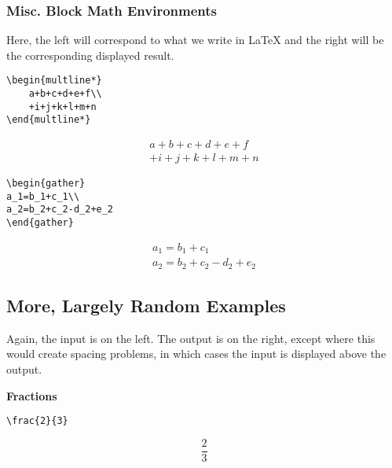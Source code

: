 \documentclass[letterpaper,twoside,10pt]{article}
\begin{document}
\newpage
\subsubsection{Misc. Block Math Environments}

Here, the left will correspond to what we write in {\LaTeX} and the right will be the corresponding
displayed result.

\begin{multicols}{2}
\begin{verbatim}
\begin{multline*}
    a+b+c+d+e+f\\
    +i+j+k+l+m+n
\end{multline*}
\end{verbatim}

\begin{multline*}
    a+b+c+d+e+f\\
    +i+j+k+l+m+n
\end{multline*}
\end{multicols}


\begin{multicols}{2}
\begin{verbatim}
\begin{gather}
a_1=b_1+c_1\\
a_2=b_2+c_2-d_2+e_2
\end{gather}
\end{verbatim}

\begin{gather}
a_1=b_1+c_1\\
a_2=b_2+c_2-d_2+e_2
\end{gather}
\end{multicols}


\subsection{More, Largely Random Examples}

Again, the input is on the left. The output is on the right, except where this would create spacing
problems, in which cases the input is displayed above the output.

\bigbreak\textbf{Fractions}

\begin{multicols}{2}
\begin{verbatim}
\frac{2}{3} 
\end{verbatim}
\[
 \frac{2}{3}
\]
\end{multicols}
\end{document}
